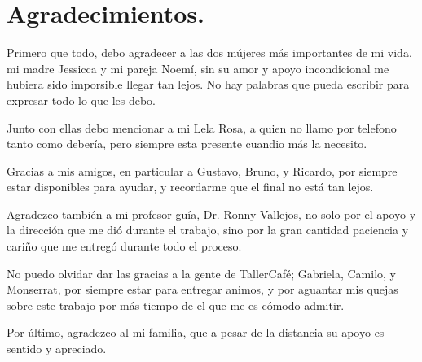 \chapter*{Agradecimientos.}

Primero que todo, debo agradecer a las dos m\'ujeres m\'as importantes de mi vida, mi madre Jessicca y mi pareja Noem\'i, sin su amor y apoyo incondicional me hubiera sido imporsible llegar tan lejos. No hay palabras que pueda escribir para expresar todo lo que les debo.

Junto con ellas debo mencionar a mi Lela Rosa, a quien no llamo por telefono tanto como deber\'ia, pero siempre esta presente cuandio m\'as la necesito.

Gracias a mis amigos, en particular a Gustavo, Bruno, y Ricardo, por siempre estar disponibles para ayudar, y recordarme que el final no está tan lejos. 

Agradezco tambi\'en a mi profesor gu\'ia, Dr. Ronny Vallejos, no solo por el apoyo y la direcci\'on que me dió durante el trabajo, sino por la gran cantidad paciencia y cariño que me entreg\'o durante todo el proceso. 

No puedo olvidar dar las gracias a la gente de TallerCaf\'e; Gabriela, Camilo, y Monserrat, por siempre estar para entregar animos, y por aguantar mis quejas sobre este trabajo por m\'as tiempo de el que me es c\'omodo admitir.

Por \'ultimo, agradezco al mi familia, que a pesar de la distancia su apoyo es sentido y apreciado.